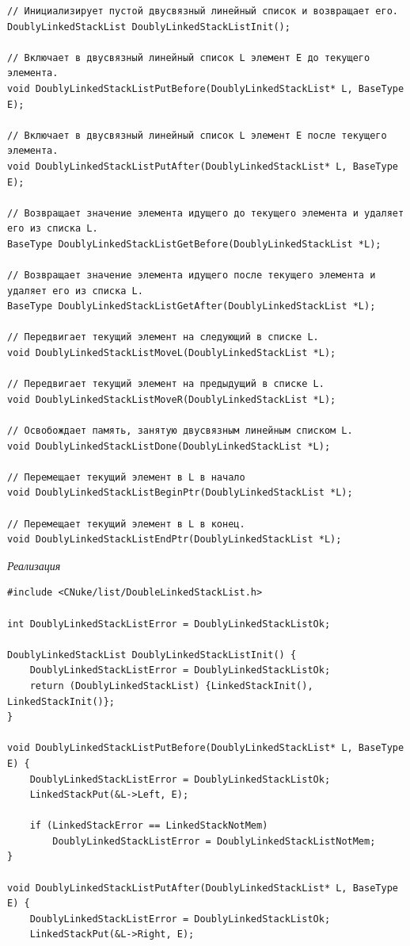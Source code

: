 \documentclass[a4paper,14pt]{extarticle}
\begin{document}
\begin{enumerate}
\begin{verbatim}
// Инициализирует пустой двусвязный линейный список и возвращает его.
DoublyLinkedStackList DoublyLinkedStackListInit();

// Включает в двусвязный линейный список L элемент E до текущего элемента.
void DoublyLinkedStackListPutBefore(DoublyLinkedStackList* L, BaseType E);

// Включает в двусвязный линейный список L элемент E после текущего элемента.
void DoublyLinkedStackListPutAfter(DoublyLinkedStackList* L, BaseType E);

// Возвращает значение элемента идущего до текущего элемента и удаляет его из списка L.
BaseType DoublyLinkedStackListGetBefore(DoublyLinkedStackList *L);

// Возвращает значение элемента идущего после текущего элемента и удаляет его из списка L.
BaseType DoublyLinkedStackListGetAfter(DoublyLinkedStackList *L);

// Передвигает текущий элемент на следующий в списке L.
void DoublyLinkedStackListMoveL(DoublyLinkedStackList *L);

// Передвигает текущий элемент на предыдущий в списке L.
void DoublyLinkedStackListMoveR(DoublyLinkedStackList *L);

// Освобождает память, занятую двусвязным линейным списком L.
void DoublyLinkedStackListDone(DoublyLinkedStackList *L);

// Перемещает текущий элемент в L в начало
void DoublyLinkedStackListBeginPtr(DoublyLinkedStackList *L);

// Перемещает текущий элемент в L в конец.
void DoublyLinkedStackListEndPtr(DoublyLinkedStackList *L);
    \end{verbatim}
    \textit{Реализация}
\begin{verbatim}
#include <CNuke/list/DoubleLinkedStackList.h>

int DoublyLinkedStackListError = DoublyLinkedStackListOk;

DoublyLinkedStackList DoublyLinkedStackListInit() {
    DoublyLinkedStackListError = DoublyLinkedStackListOk;
    return (DoublyLinkedStackList) {LinkedStackInit(), LinkedStackInit()};
}

void DoublyLinkedStackListPutBefore(DoublyLinkedStackList* L, BaseType E) {
    DoublyLinkedStackListError = DoublyLinkedStackListOk;
    LinkedStackPut(&L->Left, E);
    
    if (LinkedStackError == LinkedStackNotMem) 
        DoublyLinkedStackListError = DoublyLinkedStackListNotMem;
}

void DoublyLinkedStackListPutAfter(DoublyLinkedStackList* L, BaseType E) {
    DoublyLinkedStackListError = DoublyLinkedStackListOk;
    LinkedStackPut(&L->Right, E);
    

\end{verbatim}
\end{enumerate}
\end{document}
